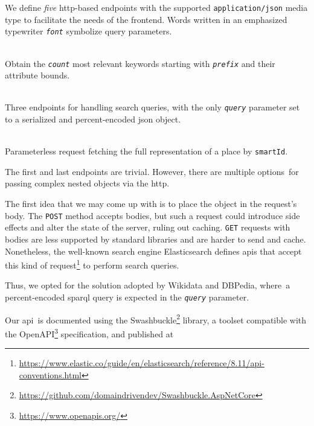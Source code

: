 We define \emph{five} \acs{http}-based endpoints with the supported \texttt{application/json} media type to facilitate the needs of the frontend. Words written in an emphasized typewriter \emph{\texttt{font}} symbolize query parameters.

\begin{description}[font=\normalfont]
\item[\texttt{GET /api/advice/keywords}]\phantom{}\\[0.3em]
Obtain the \emph{\texttt{count}} most relevant keywords starting with \emph{\texttt{prefix}} and their attribute bounds.
\item[\texttt{GET /api/search} + \texttt{/routes}, \texttt{/places}, \texttt{/direcs}]\phantom{} \\[0.3em]
Three endpoints for handling search queries, with the only \emph{\texttt{query}} parameter set to a serialized and percent-encoded \acs{json} object.
\item[\texttt{GET /api/entity/places/\{smartId\}}]\phantom{} \\[0.3em]
Parameterless request fetching the full representation of a place by \texttt{smartId}.
\end{description}

The first and last endpoints are trivial. However, there are multiple options~for passing complex nested objects via the \ac{http}.

The first idea that we may come up with is to place the object in the request's body. The \texttt{POST} method accepts bodies, but such a request could introduce side effects and alter the state of the server, ruling out caching. \texttt{GET} requests with bodies are less supported by standard libraries and are harder to send and cache. Nonetheless, the well-known search engine Elasticsearch defines \acs{api}s that accept this kind of request\footnote{\href{https://www.elastic.co/guide/en/elasticsearch/reference/8.11/api-conventions.html}{https://www.elastic.co/guide/en/elasticsearch/reference/8.11/api-conventions.html}} to perform search queries.

Thus, we opted for the solution adopted by Wikidata and DBPedia, where~a percent-encoded \acs{sparql} query is expected in the \texttt{\emph{query}} parameter.

\vspace{0.5em}

Our \acs{api}~is documented using the Swashbuckle\footnote{\href{https://github.com/domaindrivendev/Swashbuckle.AspNetCore}{https://github.com/domaindrivendev/Swashbuckle.AspNetCore}} library, a toolset compatible with the OpenAPI\footnote{\href{https://www.openapis.org/}{https://www.openapis.org/}} specification, and published at

